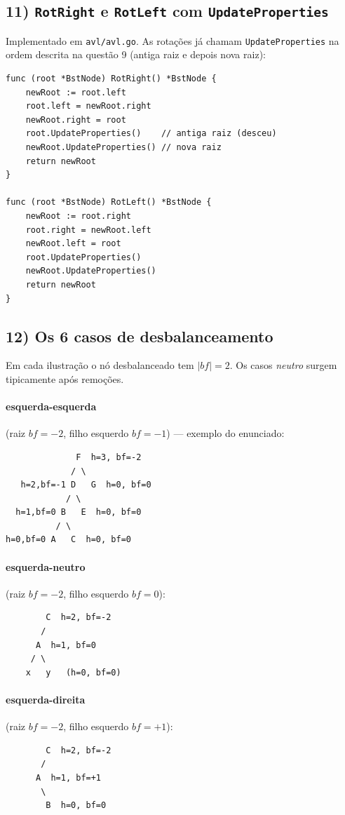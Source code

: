 \documentclass[11pt,a4paper]{article}
\begin{document}
\subsection*{11) \texttt{RotRight} e \texttt{RotLeft} com \texttt{UpdateProperties}}
Implementado em \texttt{avl/avl.go}. As rotações já chamam \texttt{UpdateProperties} na ordem
descrita na questão 9 (antiga raiz e depois nova raiz):
\begin{lstlisting}
func (root *BstNode) RotRight() *BstNode {
    newRoot := root.left
    root.left = newRoot.right
    newRoot.right = root
    root.UpdateProperties()    // antiga raiz (desceu)
    newRoot.UpdateProperties() // nova raiz
    return newRoot
}

func (root *BstNode) RotLeft() *BstNode {
    newRoot := root.right
    root.right = newRoot.left
    newRoot.left = root
    root.UpdateProperties()
    newRoot.UpdateProperties()
    return newRoot
}
\end{lstlisting}

\subsection*{12) Os 6 casos de desbalanceamento}
Em cada ilustração o nó desbalanceado tem $|bf| = 2$. Os casos \emph{neutro} surgem
tipicamente após remoções.

\paragraph{esquerda-esquerda} (raiz $bf=-2$, filho esquerdo $bf=-1$) --- exemplo do enunciado:
\begin{Verbatim}
              F  h=3, bf=-2
             / \
   h=2,bf=-1 D   G  h=0, bf=0
            / \
  h=1,bf=0 B   E  h=0, bf=0
          / \
h=0,bf=0 A   C  h=0, bf=0
\end{Verbatim}

\paragraph{esquerda-neutro} (raiz $bf=-2$, filho esquerdo $bf=0$):
\begin{Verbatim}
        C  h=2, bf=-2
       /
      A  h=1, bf=0
     / \
    x   y   (h=0, bf=0)
\end{Verbatim}

\paragraph{esquerda-direita} (raiz $bf=-2$, filho esquerdo $bf=+1$):
\begin{Verbatim}
        C  h=2, bf=-2
       /
      A  h=1, bf=+1
       \
        B  h=0, bf=0
\end{Verbatim}
\end{document}
